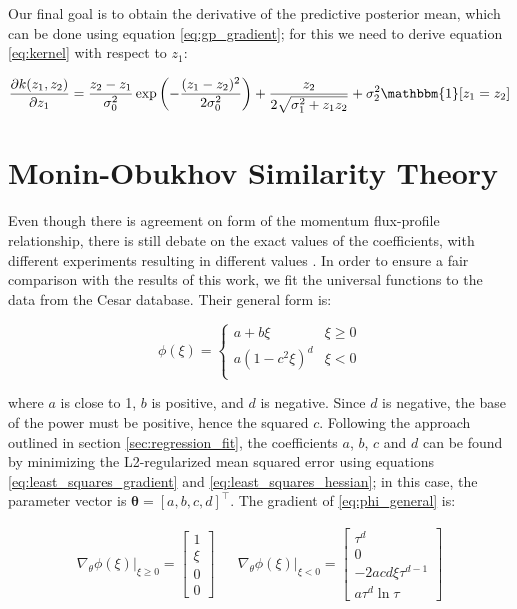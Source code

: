 \documentclass[a4paper,11pt]{kth-mag}
\begin{document}
Our final goal is to obtain the derivative of the predictive posterior mean, which can be done using equation \ref{eq:gp_gradient}; for this we need to derive equation \ref{eq:kernel} with respect to $z_1$:

\begin{equation}
\label{eq:kernel_derivative}
\frac{\partial k(z_1,z_2)}{\partial z_1}=\frac{z_2-z_1}{\sigma_0^2}\exp\left(-\frac{(z_1-z_2)^2}{2\sigma_0^2}\right)+\frac{z_2}{2\sqrt{\sigma_1^2+z_1z_2}}+\sigma_2^2\mathbbm{1}[z_1=z_2]
\end{equation}



\section{Monin-Obukhov Similarity Theory}
\label{sec:most_fit}

Even though there is agreement on form of the momentum flux-profile relationship, there is still debate on the exact values of the coefficients, with different experiments resulting in different values \citep{hogstrom88}. In order to ensure a fair comparison with the results of this work, we fit the universal functions to the data from the Cesar database. Their general form is:

\begin{equation}
\label{eq:phi_general}
\phi(\xi)=\begin{cases}
a+b\xi & \xi\geq 0 \\
a(1-c^2\xi)^d & \xi<0 \\
\end{cases}
\end{equation}

\noindent where $a$ is close to 1, $b$ is positive, and $d$ is negative. Since $d$ is negative, the base of the power must be positive, hence the squared $c$. Following the approach outlined in section \ref{sec:regression_fit}, the coefficients $a$, $b$, $c$ and $d$ can be found by minimizing the L2-regularized mean squared error using equations \ref{eq:least_squares_gradient} and \ref{eq:least_squares_hessian}; in this case, the parameter vector is $\bm\theta=\left[a,b,c,d\right]^\intercal$. The gradient of \ref{eq:phi_general} is:


\begin{align}
\nabla_\theta\phi(\xi)\vert_{\xi\geq 0}=\begin{bmatrix}
1 \\ \xi \\ 0 \\ 0
\end{bmatrix} &&
\nabla_\theta\phi(\xi)\vert_{\xi<0}=\begin{bmatrix}
\tau^d \\ 0 \\ -2acd\xi\tau^{d-1} \\ a\tau^d\ln\tau
\end{bmatrix}
\end{align}
\end{document}
